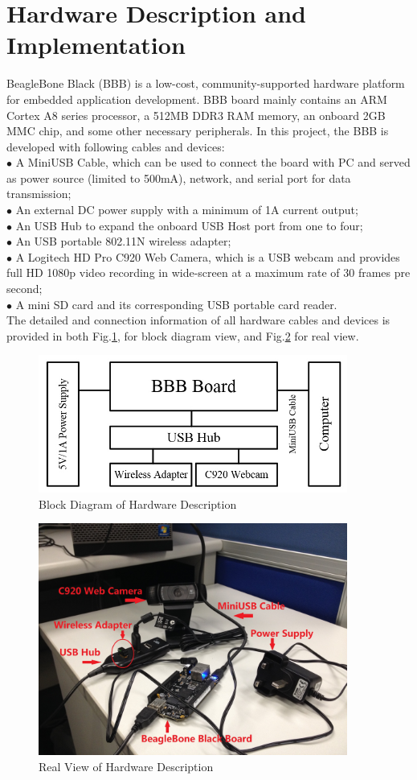 \documentclass[12pt,journal,draftclsnofoot,onecolumn]{IEEEtran}
\begin{document}
\section{Hardware Description and Implementation}\label{HdDes}
BeagleBone Black (BBB) is a low-cost, community-supported hardware platform for embedded application development. BBB board mainly contains an ARM Cortex A8 series processor, a 512MB DDR3 RAM memory, an onboard 2GB MMC chip, and some other necessary peripherals. In this project, the BBB is developed with following cables and devices: \\
$\bullet$ A MiniUSB Cable, which can be used to connect the board with PC and served as power source (limited to 500mA), network, and serial port for data transmission;\\
$\bullet$ An external DC power supply with a minimum of 1A current output;\\
$\bullet$ An USB Hub to expand the onboard USB Host port from one to four;\\
$\bullet$ An USB portable 802.11N wireless adapter;\\
$\bullet$ A Logitech HD Pro C920 Web Camera, which is a USB webcam and provides full HD 1080p video recording in wide-screen at a maximum rate of 30 frames pre second;\\
$\bullet$ A mini SD card and its corresponding USB portable card reader.\\
The detailed and connection information of all hardware cables and devices is provided in both Fig.\ref{hw1}, for block diagram view, and Fig.\ref{hw2} for real view.
\begin{figure}[ht]
	\centering
	\includegraphics[width=4in]{./figs/hw1.jpg}
	\caption{Block Diagram of Hardware Description}
	\label{hw1}
\end{figure}
\begin{figure}[ht]
	\centering
	\includegraphics[width=4in]{./figs/hw2.jpg}
	\caption{Real View of Hardware Description}
	\label{hw2}
\end{figure}
\end{document}
